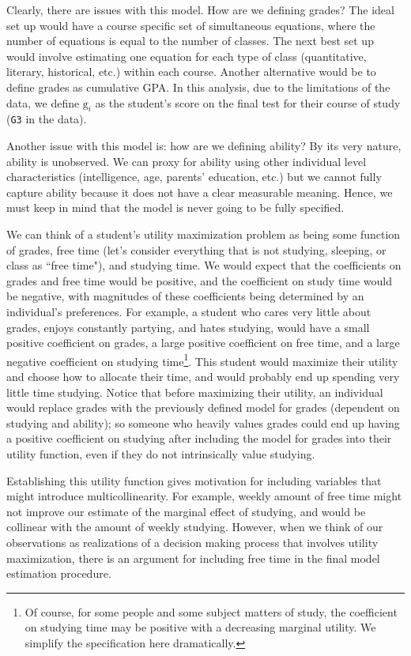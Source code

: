 \documentclass[12pt]{article}
\newcommand{\inlinecode}{\texttt}
\begin{document}
Clearly, there are issues with this model. How are we defining grades? The ideal set up would have a course specific set of simultaneous equations, where the number of equations is equal to the number of classes. The next best set up would involve estimating one equation for each type of class (quantitative, literary, historical, etc.) within each course. Another alternative would be to define grades as cumulative GPA. In this analysis, due to the limitations of the data, we define $\mathrm{g}_i$ as the student's score on the final test for their course of study (\inlinecode{G3} in the data).

Another issue with this model is: how are we defining ability? By its very nature, ability is unobserved. We can proxy for ability using other individual level characteristics (intelligence, age, parents' education, etc.) but we cannot fully capture ability because it does not have a clear measurable meaning. Hence, we must keep in mind that the model is never going to be fully specified.

We can think of a student's utility maximization problem as being some function of grades, free time (let's consider everything that is not studying, sleeping, or class as ``free time"), and studying time. We would expect that the coefficients on grades and free time would be positive, and the coefficient on study time would be negative, with magnitudes of these coefficients being determined by an individual's preferences. For example, a student who cares very little about grades, enjoys constantly partying, and hates studying, would have a small positive coefficient on grades, a large positive coefficient on free time, and a large negative coefficient on studying time\footnote{Of course, for some people and some subject matters of study, the coefficient on studying time may be positive with a decreasing marginal utility. We simplify the specification here dramatically.}. This student would maximize their utility and choose how to allocate their time, and would probably end up spending very little time studying. Notice that before maximizing their utility, an individual would replace grades with the previously defined model for grades (dependent on studying and ability); so someone who heavily values grades could end up having a positive coefficient on studying after including the model for grades into their utility function, even if they do not intrinsically value studying.

Establishing this utility function gives motivation for including variables that might introduce multicollinearity. For example, weekly amount of free time might not improve our estimate of the marginal effect of studying, and would be collinear with the amount of weekly studying. However, when we think of our observations as realizations of a decision making process that involves utility maximization, there is an argument for including free time in the final model estimation procedure.
\end{document}
